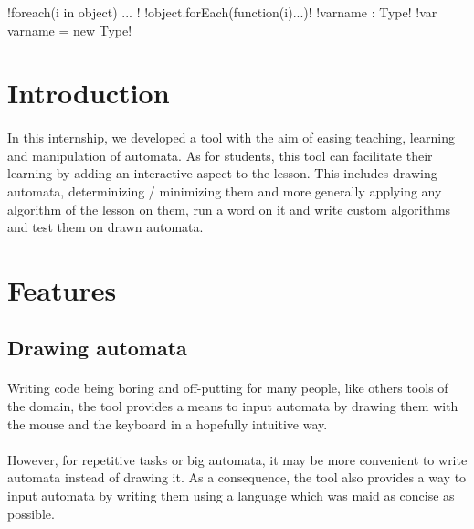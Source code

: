 \documentclass{article}
\begin{document}
\maketitle
\tableofcontents
\begin{sloppypar}
\DefineShortVerb{\!}
!foreach(i in object) { ... }!
!object.forEach(function(i){...})!
!varname : Type!
!var varname = new Type!
\UndefineShortVerb{\!}




\section*{ Introduction}


\paragraph{}
In this internship, we developed a tool with the aim of easing teaching, learning and manipulation of automata. As for students, this tool can facilitate their learning by adding an interactive aspect to the lesson. This includes drawing automata, determinizing / minimizing them and more generally applying any algorithm of the lesson on them, run a word on it and write custom algorithms and test them on drawn automata.




\section{ Features}



\subsection{ Drawing automata}


\paragraph{}
Writing code being boring and off-putting for many people, like others tools of the domain, the tool provides a means to input automata by drawing them with the mouse and the keyboard in a hopefully intuitive way.

      
\paragraph{}
However, for repetitive tasks or big automata, it may be more convenient to write automata instead of drawing it. As a consequence, the tool also provides a way to input automata by writing them using a language which was maid as concise as possible.


\end{sloppypar}
\end{document}

